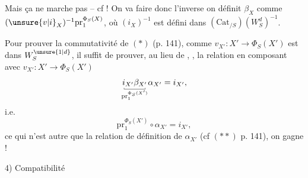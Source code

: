 Mais ça ne marche pas -- cf  ! On va faire donc l'inverse
on définit $\beta_X$ comme $(\unsure{v|i}_X)^{-1}\mathrm{pr}_1^{\Phi_S(X)}$, où $(i_X)^{-1}$ est défini dans $(\mathrm{Cat}_{/S})(W_S^d)^{-1}$.

Pour prouver la commutativité de $(*)$ (p. 141), comme $v_{X'}:X'\longrightarrow\Phi_S(X')$ est dans $W_S^{\unsure{1|d}}$, il suffit de prouver, au lieu de , , la relation  en composant avec $v_{X'}:X'\longrightarrow\Phi_S(X')$
\[
 \underset{\substack{\rule{.35pt}{.4ex}\rule{2.5em}{.35pt}\rule{.35pt}{.4ex}\\\mathrm{pr}_1^{\Phi_S(X')}}}{i_{X'}\beta_{X'}}\alpha_{X'}=i_{X'},
\]
i.e.
\[
 \mathrm{pr}_1^{\Phi_S(X')}\circ\alpha_{X'}=i_{X'},
\]
ce qui n'est autre que la relation de définition de $\alpha_{X'}$ (cf $(**)$ p. 141), on gagne !

4) Compatibilité
